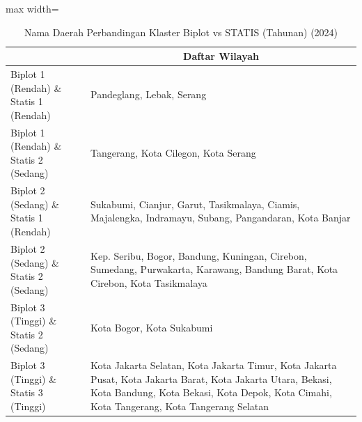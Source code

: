 \begin{table}[H]
\centering
\caption{Nama Daerah Perbandingan Klaster Biplot vs STATIS (Tahunan) (2024)} \label{tab:app2biplot_statis_comp_name_2024}
\begin{adjustbox}{max width=\textwidth}
\begin{tabular}{|>{\centering\arraybackslash}p{4cm}|p{10cm}|}
\hline
\multicolumn{1}{|c|}{\textbf{Kategori}} & \multicolumn{1}{c|}{\textbf{Daftar Wilayah}} \\
\hline
Biplot 1 (Rendah) \& Statis 1 (Rendah) & Pandeglang, Lebak, Serang \\
\hline
Biplot 1 (Rendah) \& Statis 2 (Sedang) & Tangerang, Kota Cilegon, Kota Serang \\
\hline
Biplot 2 (Sedang) \& Statis 1 (Rendah) & Sukabumi, Cianjur, Garut, Tasikmalaya, Ciamis, Majalengka, Indramayu, Subang, Pangandaran, Kota Banjar \\
\hline
Biplot 2 (Sedang) \& Statis 2 (Sedang) & Kep. Seribu, Bogor, Bandung, Kuningan, Cirebon, Sumedang, Purwakarta, Karawang, Bandung Barat, Kota Cirebon, Kota Tasikmalaya \\
\hline
Biplot 3 (Tinggi) \& Statis 2 (Sedang) & Kota Bogor, Kota Sukabumi \\
\hline
Biplot 3 (Tinggi) \& Statis 3 (Tinggi) & Kota Jakarta Selatan, Kota Jakarta Timur, Kota Jakarta Pusat, Kota Jakarta Barat, Kota Jakarta Utara, Bekasi, Kota Bandung, Kota Bekasi, Kota Depok, Kota Cimahi, Kota Tangerang, Kota Tangerang Selatan \\
\hline
\end{tabular}
\end{adjustbox}
\end{table}
